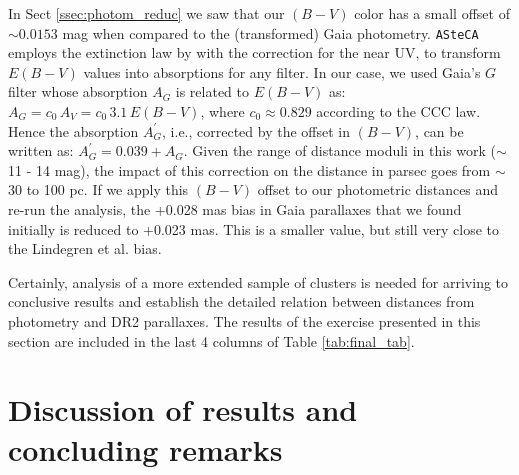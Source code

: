 \documentclass[draft]{aa}
\begin{document}
In Sect \ref{ssec:photom_reduc} we saw that our $(B-V)$ color has a small
offset of $\sim0.0153$ mag when compared to the (transformed) Gaia photometry.
\texttt{ASteCA} employs the extinction law by \citet[][CCC law]{Cardelli_1989}
with the \citet{Odonnell_1994} correction for the near UV, to transform $E
(B-V)$ values into absorptions for any filter.
In our case, we used Gaia's $G$ filter whose absorption $A_G$ is related to $E
(B-V)$ as: $A_G = c_0 \, A_V  = c_0 \, 3.1 \, E(B-V)$, where $c_0\approx0.829$
according to the CCC law. Hence the absorption $A_{G}^{\prime}$, i.e.,
corrected by the offset in $(B-V)$, can be written as: $A_{G}^
{\prime}=0.039+A_G$.
Given the range of distance moduli in this work ($\sim$11 - 14 mag), the impact
of this correction on the distance in parsec goes from $\sim$30 to 100 pc.
If we apply this $(B-V)$ offset to our photometric distances and re-run the
analysis, the +0.028 mas bias in Gaia parallaxes that we found
initially is reduced to +0.023 mas. This is a smaller value, but still very
close to the Lindegren et al. bias.

Certainly, analysis of a more extended sample of clusters is needed for
arriving to conclusive results and establish the detailed relation between
distances from photometry and DR2 parallaxes. The results of the exercise
presented in this section are included in the last 4 columns of Table 
\ref{tab:final_tab}.




\section{Discussion of results and concluding remarks}
\label{sec:results_concl}
\end{document}
